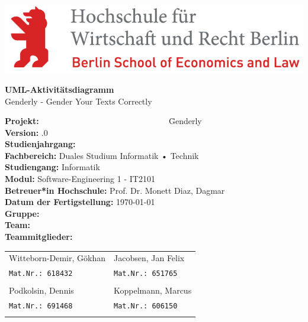 \hfill
\includegraphics[scale=1]
{Bilder/Logos/HWR_Logo_farbig.jpg}

\begin{center}
	\vspace{1cm}
	\Huge{\textbf{UML-Aktivitätsdiagramm}}\\
	\vspace{1cm}
	\Large{Genderly - Gender Your Texts Correctly}\\
	\vspace{1cm}
\end{center}{\huge \par}

\begin{doublespacing}
	\begin{large}
		\begin{tabbing}
			
			\textbf{Projekt:} ~~~~~~~~~~~~~~~~~~~~~~~~~~~~~~ \= Genderly \\
			\textbf{Version:} .0 \\
			\textbf{Studienjahrgang:} \\
			\textbf{Fachbereich:} \> Duales Studium Informatik • Technik \\
			\textbf{Studiengang:} \> Informatik \\
			\textbf{Modul:}	 \> Software-Engineering 1 - IT2101\\
			\textbf{Betreuer*in Hochschule:} \> Prof. Dr. Monett Diaz, Dagmar \\
			\textbf{Datum der Fertigstellung:} \> \today \\
			\textbf{Gruppe:} \\
			\textbf{Team:} \\
			\textbf{Teammitglieder:} \>  \\
			
		\end{tabbing}
	\end{large}
\end{doublespacing}


	\vspace{-1cm}
	\begin{tabular}{ll}
		\large{Witteborn-Demir, Gökhan}  &  \large{Jacobsen, Jan Felix}\\
		\texttt{Mat.Nr.: 618432}    	 &  \texttt{Mat.Nr.: 651765}\\
		& \\
		\large{Podkolsin, Dennis}   	 &  \large{Koppelmann, Marcus}\\
		\texttt{Mat.Nr.: 691468}    	 &  \texttt{Mat.Nr.: 606150}\\
		& \\
	\end{tabular}

	
	\pagebreak
	
